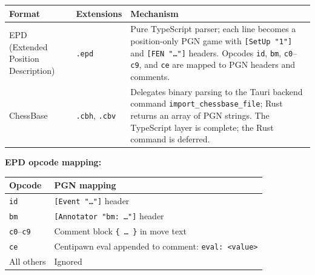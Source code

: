\documentclass[]{article}
\begin{document}
\begin{longtable}[]{@{}lll@{}}
\toprule
\begin{minipage}[b]{0.05\columnwidth}\raggedright\strut
Format\strut
\end{minipage} & \begin{minipage}[b]{0.05\columnwidth}\raggedright\strut
Extensions\strut
\end{minipage} & \begin{minipage}[b]{0.05\columnwidth}\raggedright\strut
Mechanism\strut
\end{minipage}\tabularnewline
\midrule
\endhead
\begin{minipage}[t]{0.05\columnwidth}\raggedright\strut
EPD (Extended Position Description)\strut
\end{minipage} & \begin{minipage}[t]{0.05\columnwidth}\raggedright\strut
\texttt{.epd}\strut
\end{minipage} & \begin{minipage}[t]{0.05\columnwidth}\raggedright\strut
Pure TypeScript parser; each line becomes a position-only PGN game with
\texttt{{[}SetUp\ "1"{]}} and \texttt{{[}FEN\ "\ldots{}"{]}} headers.
Opcodes \texttt{id}, \texttt{bm}, \texttt{c0}--\texttt{c9}, and
\texttt{ce} are mapped to PGN headers and comments.\strut
\end{minipage}\tabularnewline
\begin{minipage}[t]{0.05\columnwidth}\raggedright\strut
ChessBase\strut
\end{minipage} & \begin{minipage}[t]{0.05\columnwidth}\raggedright\strut
\texttt{.cbh}, \texttt{.cbv}\strut
\end{minipage} & \begin{minipage}[t]{0.05\columnwidth}\raggedright\strut
Delegates binary parsing to the Tauri backend command
\texttt{import\_chessbase\_file}; Rust returns an array of PGN strings.
The TypeScript layer is complete; the Rust command is deferred.\strut
\end{minipage}\tabularnewline
\bottomrule
\end{longtable}

\textbf{EPD opcode mapping:}

\begin{longtable}[]{@{}ll@{}}
\toprule
Opcode & PGN mapping\tabularnewline
\midrule
\endhead
\texttt{id} & \texttt{{[}Event\ "\ldots{}"{]}} header\tabularnewline
\texttt{bm} & \texttt{{[}Annotator\ "bm:\ \ldots{}"{]}}
header\tabularnewline
\texttt{c0}--\texttt{c9} & Comment block \texttt{\{\ \ldots{}\ \}} in
move text\tabularnewline
\texttt{ce} & Centipawn eval appended to comment:
\texttt{eval:\ \textless{}value\textgreater{}}\tabularnewline
All others & Ignored\tabularnewline
\bottomrule
\end{longtable}
\end{document}
